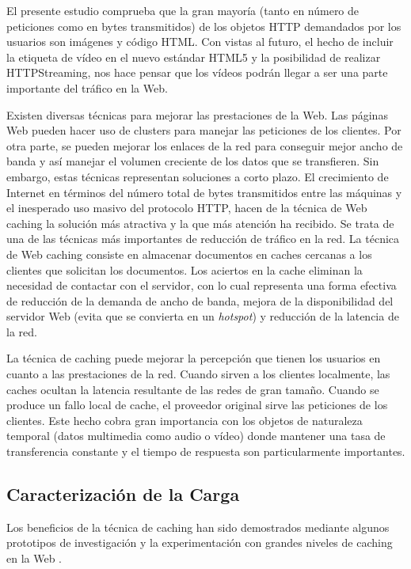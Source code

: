 \documentclass[twocolumn,twoside]{Jornadas}
\begin{document}
El presente estudio comprueba que la gran mayoría (tanto en número de peticiones como en bytes transmitidos) de los objetos HTTP demandados por los usuarios son imágenes y código HTML. Con vistas al futuro, el hecho de incluir la etiqueta de vídeo en el nuevo estándar HTML5 y la posibilidad de realizar HTTPStreaming, nos hace pensar que los vídeos podrán llegar a ser una parte importante del tráfico en la Web.

Existen diversas técnicas para mejorar las prestaciones de la Web. Las páginas Web pueden hacer uso de clusters para manejar las peticiones de los clientes. Por otra parte, se pueden mejorar los enlaces de la red para conseguir mejor ancho de banda y así manejar el volumen creciente de los datos que se transfieren. Sin embargo, estas técnicas representan soluciones a corto plazo. El crecimiento de Internet en términos del número total de bytes transmitidos entre las máquinas y el inesperado uso masivo del protocolo HTTP, hacen de la técnica de Web caching la solución más atractiva y la que más atención ha recibido. Se trata de una de las técnicas más importantes de reducción de tráfico en la red. La técnica de Web caching consiste en almacenar documentos en caches cercanas a los clientes que solicitan los documentos. Los aciertos en la cache eliminan la necesidad de contactar con el servidor, con lo cual representa una forma efectiva de reducción de la demanda de ancho de banda, mejora de la disponibilidad del servidor Web (evita que se convierta en un \emph{hotspot}) y reducción de la latencia de la red.

La técnica de caching puede mejorar la percepción que tienen los usuarios en cuanto a las prestaciones de la red. Cuando sirven a los clientes localmente, las caches ocultan la latencia resultante de las redes de gran tamaño. Cuando se produce un fallo local de cache, el proveedor original sirve las peticiones de los clientes.
Este hecho cobra gran importancia con los objetos de naturaleza temporal (datos multimedia como audio o vídeo) donde mantener una tasa de transferencia constante y el tiempo de respuesta son particularmente importantes.

\subsection{Caracterización de la Carga}
Los beneficios de la técnica de caching han sido demostrados mediante algunos prototipos de investigación y la experimentación con grandes niveles de caching en la Web \cite{squid}. 
\end{document}
